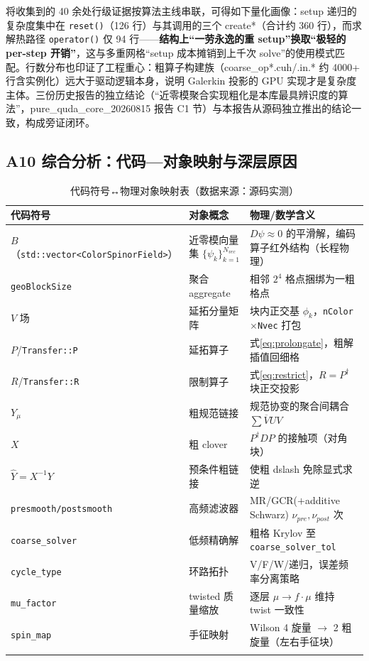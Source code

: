 \documentclass[UTF8]{ctexart}
\begin{document}
将收集到的 40 余处行级证据按算法主线串联，可得如下量化画像：setup 递归的复杂度集中在 \texttt{reset()}（126 行）与其调用的三个 create*（合计约 360 行），而求解热路径 \texttt{operator()} 仅 94 行——\textbf{结构上``一劳永逸的重 setup''换取``极轻的 per-step 开销''}，这与多重网格``setup 成本摊销到上千次 solve''的使用模式匹配。行数分布也印证了工程重心：粗算子构建族（coarse\_op*.cuh/.in.* 约 4000+ 行含实例化）远大于驱动逻辑本身，说明 Galerkin 投影的 GPU 实现才是复杂度主体。三份历史报告的独立结论（``近零模聚合实现粗化是本库最具辨识度的算法''，\textcolor{reference}{pure\_quda\_core\_20260815 报告 C1 节}）与本报告从源码独立推出的结论一致，构成旁证闭环。

\subsection{A10 综合分析：代码—对象映射与深层原因}

\begin{xltabular}{\textwidth}{llX}
\toprule
代码符号 & 对象概念 & 物理/数学含义 \\
\midrule
\endhead
$B$（\texttt{std::vector<ColorSpinorField>}） & 近零模向量集 $\{\psi_k\}_{k=1}^{N_{vec}}$ & $D\psi\approx0$ 的平滑解，编码算子红外结构（长程物理） \\
\texttt{geoBlockSize} & 聚合 aggregate & 相邻 $2^4$ 格点捆绑为一粗格点 \\
$V$ 场 & 延拓分量矩阵 & 块内正交基 $\phi_k$，\texttt{nColor}$\times$\texttt{Nvec} 打包 \\
$P$/\texttt{Transfer::P} & 延拓算子 & 式\eqref{eq:prolongate}，粗解插值回细格 \\
$R$/\texttt{Transfer::R} & 限制算子 & 式\eqref{eq:restrict}，$R=P^\dagger$ 块正交投影 \\
$Y_\mu$ & 粗规范链接 & 规范协变的聚合间耦合 $\sum\overline{V}UV$ \\
$X$ & 粗 clover & $P^\dagger DP$ 的接触项（对角块） \\
$\hat Y=X^{-1}Y$ & 预条件粗链接 & 使粗 dslash 免除显式求逆 \\
\texttt{presmooth/postsmooth} & 高频滤波器 & MR/GCR($+$additive Schwarz) $\nu_{pre},\nu_{post}$ 次 \\
\texttt{coarse\_solver} & 低频精确解 & 粗格 Krylov 至 \texttt{coarse\_solver\_tol} \\
\texttt{cycle\_type} & 环路拓扑 & V/F/W/递归，误差频率分离策略 \\
\texttt{mu\_factor} & twisted 质量缩放 & 逐层 $\mu\to f\cdot\mu$ 维持 twist 一致性 \\
\texttt{spin\_map} & 手征映射 & Wilson 4 旋量 $\to$ 2 粗旋量（左右手征块） \\
\bottomrule
\caption{代码符号↔物理对象映射表（数据来源：源码实测）}
\end{xltabular}
\end{document}
